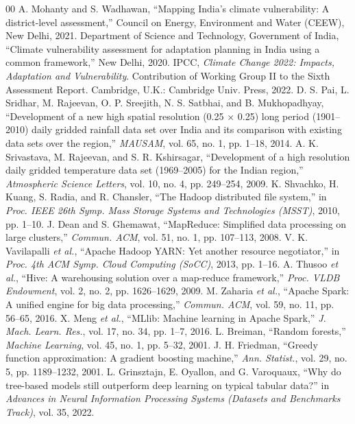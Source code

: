 \documentclass[conference]{IEEEtran}
\begin{document}
\begin{thebibliography}{00}
 A. Mohanty and S. Wadhawan, ``Mapping India's climate vulnerability: A district-level assessment,'' Council on Energy, Environment and Water (CEEW), New Delhi, 2021.
 Department of Science and Technology, Government of India, ``Climate vulnerability assessment for adaptation planning in India using a common framework,'' New Delhi, 2020.
 IPCC, \emph{Climate Change 2022: Impacts, Adaptation and Vulnerability}. Contribution of Working Group II to the Sixth Assessment Report. Cambridge, U.K.: Cambridge Univ. Press, 2022.
 D. S. Pai, L. Sridhar, M. Rajeevan, O. P. Sreejith, N. S. Satbhai, and B. Mukhopadhyay, ``Development of a new high spatial resolution (0.25\textdegree{} $\times$ 0.25\textdegree{}) long period (1901--2010) daily gridded rainfall data set over India and its comparison with existing data sets over the region,'' \emph{MAUSAM}, vol. 65, no. 1, pp. 1--18, 2014.
 A. K. Srivastava, M. Rajeevan, and S. R. Kshirsagar, ``Development of a high resolution daily gridded temperature data set (1969--2005) for the Indian region,'' \emph{Atmospheric Science Letters}, vol. 10, no. 4, pp. 249--254, 2009.
 K. Shvachko, H. Kuang, S. Radia, and R. Chansler, ``The Hadoop distributed file system,'' in \emph{Proc. IEEE 26th Symp. Mass Storage Systems and Technologies (MSST)}, 2010, pp. 1--10.
 J. Dean and S. Ghemawat, ``MapReduce: Simplified data processing on large clusters,'' \emph{Commun. ACM}, vol. 51, no. 1, pp. 107--113, 2008.
 V. K. Vavilapalli \emph{et al.}, ``Apache Hadoop YARN: Yet another resource negotiator,'' in \emph{Proc. 4th ACM Symp. Cloud Computing (SoCC)}, 2013, pp. 1--16.
 A. Thusoo \emph{et al.}, ``Hive: A warehousing solution over a map-reduce framework,'' \emph{Proc. VLDB Endowment}, vol. 2, no. 2, pp. 1626--1629, 2009.
 M. Zaharia \emph{et al.}, ``Apache Spark: A unified engine for big data processing,'' \emph{Commun. ACM}, vol. 59, no. 11, pp. 56--65, 2016.
 X. Meng \emph{et al.}, ``MLlib: Machine learning in Apache Spark,'' \emph{J. Mach. Learn. Res.}, vol. 17, no. 34, pp. 1--7, 2016.
 L. Breiman, ``Random forests,'' \emph{Machine Learning}, vol. 45, no. 1, pp. 5--32, 2001.
 J. H. Friedman, ``Greedy function approximation: A gradient boosting machine,'' \emph{Ann. Statist.}, vol. 29, no. 5, pp. 1189--1232, 2001.
 L. Grinsztajn, E. Oyallon, and G. Varoquaux, ``Why do tree-based models still outperform deep learning on typical tabular data?'' in \emph{Advances in Neural Information Processing Systems (Datasets and Benchmarks Track)}, vol. 35, 2022.

\end{thebibliography}
\end{document}
